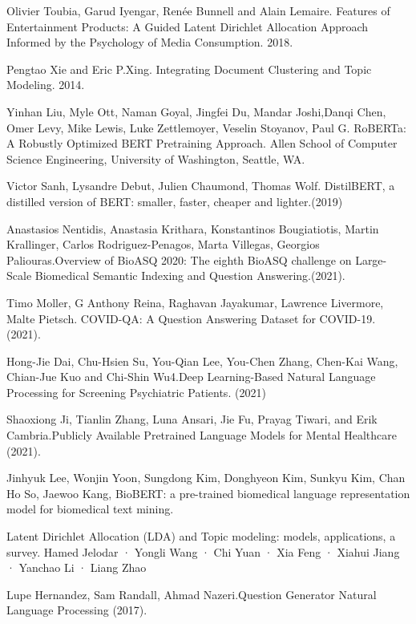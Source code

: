 \documentclass[runningheads]{llncs}
\begin{document}
\begin{thebibliography}{8}
 Olivier Toubia, Garud Iyengar, Renée Bunnell and Alain Lemaire. Features of Entertainment Products: A Guided Latent Dirichlet Allocation Approach Informed by the Psychology of Media Consumption. 2018. 

Pengtao Xie and Eric P.Xing. Integrating Document Clustering and Topic Modeling. 2014.

 Yinhan Liu, Myle Ott, Naman Goyal, Jingfei Du, Mandar Joshi,Danqi Chen, Omer Levy, Mike Lewis, Luke Zettlemoyer, Veselin Stoyanov, Paul G. RoBERTa: A Robustly Optimized BERT Pretraining Approach. Allen School of Computer Science Engineering, University of Washington, Seattle, WA.

 Victor Sanh, Lysandre Debut, Julien Chaumond, Thomas Wolf. DistilBERT, a distilled version of BERT: smaller, faster, cheaper and lighter.(2019)

Anastasios Nentidis, Anastasia Krithara, Konstantinos Bougiatiotis, Martin Krallinger, Carlos Rodriguez-Penagos, Marta Villegas, Georgios Paliouras.Overview of BioASQ 2020: The eighth BioASQ challenge on Large-Scale Biomedical Semantic Indexing and Question Answering.(2021). 

Timo Moller, G Anthony Reina, Raghavan Jayakumar, Lawrence Livermore, Malte Pietsch. COVID-QA: A Question Answering Dataset for COVID-19. (2021). 


Hong-Jie Dai, Chu-Hsien Su, You-Qian Lee, You-Chen Zhang, Chen-Kai Wang, Chian-Jue Kuo and Chi-Shin Wu4.Deep Learning-Based Natural Language Processing for Screening Psychiatric Patients. (2021)

Shaoxiong Ji, Tianlin Zhang, Luna Ansari, Jie Fu, Prayag Tiwari, and Erik Cambria.Publicly Available Pretrained Language Models for Mental Healthcare (2021).


Jinhyuk Lee, Wonjin Yoon, Sungdong Kim, Donghyeon Kim, Sunkyu Kim, Chan Ho So, Jaewoo Kang, BioBERT: a pre-trained biomedical language representation model for biomedical text mining.

Latent Dirichlet Allocation (LDA) and Topic modeling: models, applications, a survey. Hamed Jelodar · Yongli Wang · Chi Yuan · Xia Feng · Xiahui Jiang · Yanchao Li · Liang Zhao


 Lupe Hernandez, Sam Randall, Ahmad Nazeri.Question Generator
Natural Language Processing (2017).
\end{thebibliography}
\end{document}
